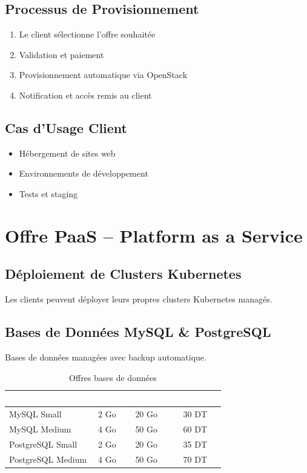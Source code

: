 \documentclass[12pt,a4paper,twoside]{report}
\begin{document}
\subsection{Processus de Provisionnement}

\begin{enumerate}
    \item Le client sélectionne l'offre souhaitée
    \item Validation et paiement
    \item Provisionnement automatique via OpenStack
    \item Notification et accès remis au client
\end{enumerate}

\subsection{Cas d'Usage Client}

\begin{itemize}
    \item Hébergement de sites web
    \item Environnements de développement
    \item Tests et staging
\end{itemize}

\section{Offre PaaS – Platform as a Service}

\subsection{Déploiement de Clusters Kubernetes}

Les clients peuvent déployer leurs propres clusters Kubernetes managés.

\subsection{Bases de Données MySQL \& PostgreSQL}

Bases de données managées avec backup automatique.

\begin{table}[H]
    \centering
    \caption{Offres bases de données}
    \label{tab:bdd}
    \begin{tabular}{|l|c|c|c|}
        \hline
        \rowcolor{orange!80}
        \textcolor{white}{\textbf{Type}} & \textcolor{white}{\textbf{RAM}} & \textcolor{white}{\textbf{Stockage}} & \textcolor{white}{\textbf{Prix/mois}} \\
        \hline
        MySQL Small & 2 Go & 20 Go & 30 DT \\
        MySQL Medium & 4 Go & 50 Go & 60 DT \\
        PostgreSQL Small & 2 Go & 20 Go & 35 DT \\
        PostgreSQL Medium & 4 Go & 50 Go & 70 DT \\
        \hline
    \end{tabular}
\end{table}
\end{document}
